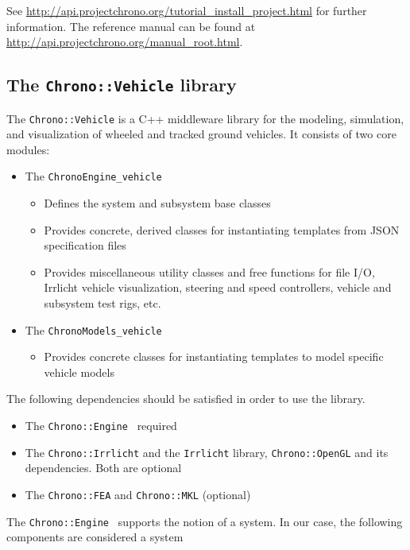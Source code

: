 See \url{http://api.projectchrono.org/tutorial_install_project.html} for further information. The reference manual can be found at
\url{http://api.projectchrono.org/manual_root.html}.

\subsection{The \lstinline{Chrono::Vehicle} library}

The \lstinline{Chrono::Vehicle} is a C++ middleware library for the modeling, simulation, and visualization of wheeled and tracked ground vehicles.
It consists of two core modules:

\begin{itemize}
\item The \lstinline{ChronoEngine_vehicle}

	\begin{itemize}
		\item Defines the system and subsystem base classes
		\item Provides concrete, derived classes for instantiating templates from JSON specification files
		\item Provides miscellaneous utility classes and free functions for file I/O, Irrlicht vehicle visualization, steering and speed controllers, vehicle and subsystem test rigs, etc.
	\end{itemize}

\item The \lstinline{ChronoModels_vehicle}
	\begin{itemize}
		\item Provides concrete classes for instantiating templates to model specific vehicle models
	\end{itemize}
\end{itemize}

The following dependencies should be satisfied in order to use the library.

\begin{itemize}
\item The \lstinline{Chrono::Engine } required
\item The \lstinline{Chrono::Irrlicht} and the \lstinline{Irrlicht} library,  \lstinline{Chrono::OpenGL} and its dependencies. Both are optional
\item The \lstinline{Chrono::FEA} and \lstinline{Chrono::MKL} (optional)
\end{itemize}

The \lstinline{Chrono::Engine } supports the notion of a system. In our case, the following components are considered a system

